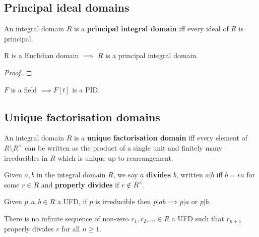 \documentclass[../Year2.tex]{subfiles}
\begin{document}
\subsection{Principal ideal domains}

\begin{definition}
    An integral domain $R$ is a \textbf{principal integral domain} iff every ideal of $R$ is principal.
\end{definition}

\begin{theorem}
    R is a Euclidian domain $\implies$ $R$ is a principal integral domain.
    \begin{proof}
        
    \end{proof}
\end{theorem}

\begin{corollary}
    $F$ is a field $\implies F[t]$ is a PID.
\end{corollary}

\subsection{Unique factorisation domains}

\begin{definition}
    An integral domain $R$ is a \textbf{unique factorisation domain} iff every element of $R\setminus R^\times$ can be written as the product of a single unit and finitely many irreducibles in $R$ which is unique up to rearrangement.
\end{definition}

\begin{definition}[Division]
    Given $a,b$ in the integral domain $R$, we say $a$ \textbf{divides} $b$, written $a|b$ iff $b=ra$ for some $r\in R$ and \textbf{properly divides} if $r\not\in R^\times$.
\end{definition}

\begin{lemma}\label{ufd1}
    Given $p,a,b\in R$ a UFD, if $p$ is irreducible then $p|ab\implies p|a$ or $p|b$.
\end{lemma}

\begin{lemma}\label{ufd2}
    There is no infinite sequence of non-zero $r_1,r_2,\ldots\in R$ a UFD such that $r_{n+1}$ properly divides $r$ for all $n\geq1$.
\end{lemma}
\end{document}
